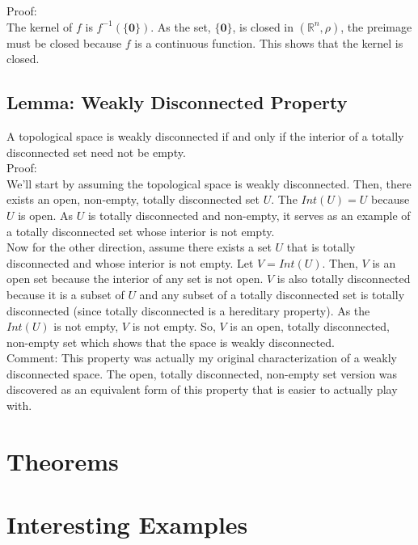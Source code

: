 \documentclass{article}
\begin{document}
Proof:\\

The kernel of $f$ is $f^{-1}(\{\mathbf{0}\})$. As the set, $\{\mathbf{0}\}$, is closed in $(\mathbb{R}^n,\rho)$, the preimage must be closed because $f$ is a continuous function. This shows that the kernel is closed.

\subsection{Lemma: Weakly Disconnected Property}
A topological space is weakly disconnected if and only if the interior of a totally disconnected set need not be empty.\\

Proof:\\

We'll start by assuming the topological space is weakly disconnected. Then, there exists an open, non-empty, totally disconnected set $U$. The $Int(U) = U$ because $U$ is open. As $U$ is totally disconnected and non-empty, it serves as an example of a totally disconnected set whose interior is not empty.\\

Now for the other direction, assume there exists a set $U$ that is totally disconnected and whose interior is not empty. Let $V = Int(U)$. Then, $V$ is an open set because the interior of any set is not open. $V$ is also totally disconnected because it is a subset of $U$ and any subset of a totally disconnected set is totally disconnected (since totally disconnected is a hereditary property). As the $Int(U)$ is not empty, $V$ is not empty. So, $V$ is an open, totally disconnected, non-empty set which shows that the space is weakly disconnected.\\

Comment: This property was actually my original characterization of a weakly disconnected space. The open, totally disconnected, non-empty set version was discovered as an equivalent form of this property that is easier to actually play with.

\newpage
\section{Theorems}

\newpage
\section{Interesting Examples}
\end{document}
